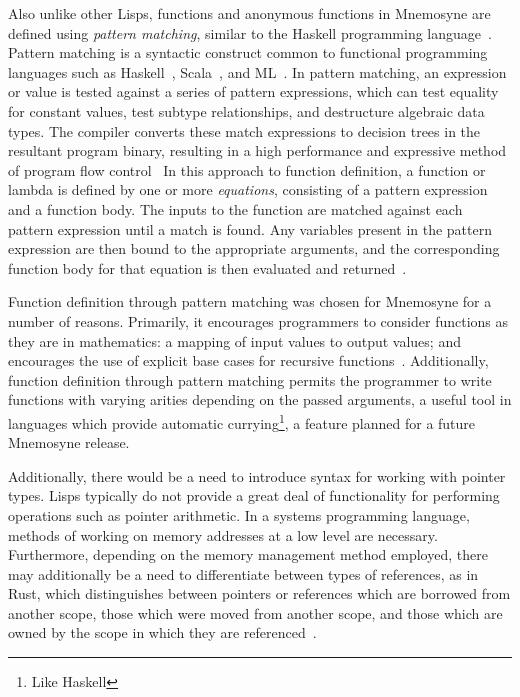 \documentclass[11pt,draft]{article}
\theoremstyle{break}
\begin{document}
Also unlike other Lisps, functions and anonymous functions in Mnemosyne are defined using \textit{pattern matching}, similar to the Haskell programming language~\cite{jones2003haskell,hudak1992gentle,hudak1992report}. Pattern matching is a syntactic construct common to functional programming languages such as Haskell~\cite{jones2003haskell,hudak1992report,hudak1992gentle}, Scala~\cite{odersky2004scala,odersky2004overview}, and ML~\cite{maranget2008compiling,Krishnaswami:2009:FPM:1594834.1480927}. In pattern matching, an expression or value is tested against a series of pattern expressions, which can test equality for constant values, test subtype relationships, and destructure algebraic data types. The compiler converts these match expressions to decision trees in the resultant program binary, resulting in a high performance and expressive method of program flow control~\cite{maranget2007warnings,Krishnaswami:2009:FPM:1594834.1480927,syme2007extensible,maranget2008compiling} In this approach to function definition, a function or lambda is defined by one or more \textit{equations}, consisting of a pattern expression and a function body. The inputs to the function are matched against each pattern expression until a match is found. Any variables present in the pattern expression are then bound to the appropriate arguments, and the corresponding function body for that equation is then evaluated and returned~\cite{jones2003haskell,hudak1992report}.

 Function definition through pattern matching was chosen for Mnemosyne for a number of reasons. Primarily, it encourages programmers to consider functions as they are in mathematics: a mapping of input values to output values; and encourages the use of explicit base cases for recursive functions~\cite{hudak1992gentle}. Additionally, function definition through pattern matching permits the programmer to write functions with varying arities depending on the passed arguments, a useful tool in languages which provide automatic currying\footnote{Like Haskell}, a feature planned for a future Mnemosyne release.

Additionally, there would be a need to introduce syntax for working with pointer types. Lisps typically do not provide a great deal of functionality for performing operations such as pointer arithmetic. In a systems programming language, methods of working on memory addresses at a low level are necessary. Furthermore, depending on the memory management method employed, there may additionally be a need to differentiate between types of references, as in Rust, which distinguishes between pointers or references which are borrowed from another scope, those which were moved from another scope, and those which are owned by the scope in which they are referenced~\cite{Matsakis:2014:RL:2663171.2663188}.
\end{document}
